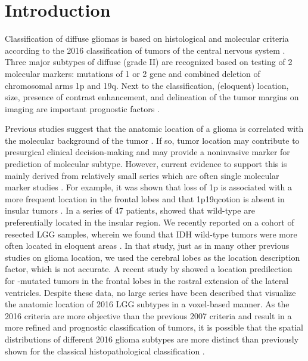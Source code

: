 \section{Introduction}
Classification of diffuse gliomas is based on histological and molecular criteria according to the 2016  classification of \glspl{tumor} of the central nervous system \autocite{louis2014international}.
Three major subtypes of diffuse  (grade II)  are recognized based on testing of 2 molecular markers: mutations of  1 or 2 gene and combined deletion of chromosomal arms 1p and 19q.
Next to the  classification, (eloquent) location, size, presence of contrast enhancement, and delineation of the \gls{tumor} margins on  imaging are important prognostic factors \autocite{pignatti2002prognostic, jakola2012low, capelle2013spontaneous, chang2008preoperative}.

Previous studies suggest that the anatomic location of a glioma is correlated with the molecular background of the \gls{tumor} \autocite{stockhammer2012idh1, goze2009lack, laigle2004correlations, metellus2010absence}.
If so, \gls{tumor} location may contribute to presurgical clinical decision-making and may provide a noninvasive marker for prediction of molecular subtype.
However, current evidence to support this is mainly derived from relatively small series which are often single molecular marker studies  \autocite{stockhammer2012idh1, goze2009lack, laigle2004correlations, metellus2010absence}.
For example, it was shown that loss of 1p is associated with a more frequent location in the frontal lobes and that \acl{1p19qcotion} is absent in insular \glspl{tumor} \autocite{goze2009lack, laigle2004correlations}.
In a series of 47 patients,  showed that  wild-type  are preferentially located in the insular region.
We recently reported on a cohort of resected LGG samples, wherein we found that IDH wild-type \glspl{tumor} were more often located in eloquent areas \autocite{wijnenga2017impact}.
In that study, just as in many other previous studies on glioma location, we used the cerebral lobes as the location description factor, which is not accurate.
A recent study by  showed a location predilection for -mutated \glspl{tumor} in the frontal lobes in the rostral extension of the lateral ventricles.
Despite these data, no large series have been described that visualize the anatomic location of  2016 LGG subtypes in a voxel-based manner.
As the  2016 criteria are more objective than the previous  2007 criteria and result in a more refined and prognostic classification of \glspl{tumor}, it is possible that the spatial distributions of different  2016 glioma subtypes are more distinct than previously shown for the classical histopathological classification \autocite{larjavaara2007incidence}.

